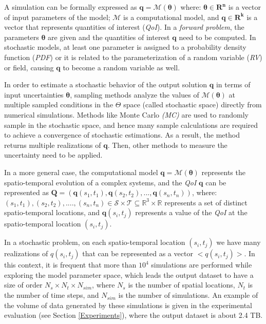\documentclass[11pt]{article}
\begin{document}
A simulation can be formally expressed as $\bm{q}=\mathcal{M}(\bm{\theta})$ where:  $\bm{\theta} \in \mathbf{R^{n}} $ is a vector of  input parameters of the model; $\mathcal{M}$ is a computational model, and $\bm{q} \in \mathbf{R^{k}}$ is a vector that represents  quantities of interest (\textit{QoI}). In a \textit{forward problem}, the parameters $\bm{\theta}$ are given and the quantities of interest $\bm{q}$  need to be computed. In stochastic models, at least one parameter is assigned to a probability density function (\textit{PDF}) or it is related to the parameterization of a random variable (\textit{RV}) or field, causing $\bm{q}$  to become a random variable as well.


In order to estimate a stochastic behavior of the output solution $\bm{q}$  in terms of input uncertainties $\bm{\theta}$, sampling methods analyze the values of $\mathcal{M}(\bm{\theta})$ at multiple sampled conditions in the $\Theta$ space (called stochastic space) directly from numerical simulations. Methods like Monte Carlo \textit{(MC)} are used to randomly sample in the stochastic space, and hence many sample calculations are required to achieve a convergence of stochastic estimations. As a result, the method returns multiple realizations of $\bm{q}$. Then, other methods to measure the uncertainty need to be applied.

In a more general case, the computational model $\bm{q}=\mathcal{M}(\bm{\theta})$ represents the spatio-temporal evolution of a complex systems, and the \textit{QoI} $\bm{q}$ can be represented as
$ \mathbf{Q} = (\mathbf{q}(s_{1},t_{1}),\mathbf{q}(s_{2},t_{2}),...,\mathbf{q}(s_{n},t_{n}))  
$, where: $(s_{1},t_{1}),(s_{2},t_{2}),....,(s_{n},t_{n}) \in \mathcal{S} \times \mathcal{T}\subseteq\mathbb{R}^{3}\times\mathbb{R}$ represents a set of distinct spatio-temporal locations, and
$\mathbf{q}(s_{i},t_{j})$ represents a value of the \textit{QoI} at the spatio-temporal location $(s_{i},t_{j})$.


In a stochastic problem, on each spatio-temporal location $(s_{i},t_{j})$ we have many realizations of $q(s_{i},t_{j})$ that can be represented as a vector $<q(s_{i},t_{j})>$. In this context, it is frequent that more than $10^4$ simulations are performed while exploring the model parameter space, which leads the output dataset to have a size of order  $N_{s}\times N_{t}\times N_{sim}$, where $N_{s}$ is the number of spatial locations, $N_{t}$ is the number of time steps, and $N_{sim}$ is the number of simulations.  An example of the volume of data generated by these simulations is given in the experimental evaluation (see Section \ref{Experiments}), where the output dataset is about 2.4 TB.
\end{document}

